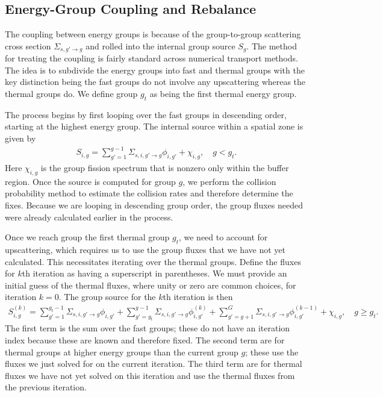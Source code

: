 \subsection{Energy-Group Coupling and Rebalance} \label{Sec:transport_collsionProbability_energyGroupCoupling}

The coupling between energy groups is because of the group-to-group scattering cross section $\Sigma_{s,g' \rightarrow g}$ and rolled into the internal group source $S_g$. The method for treating the coupling is fairly standard across numerical transport methods. The idea is to subdivide the energy groups into fast and thermal groups with the key distinction being the fast groups do not involve any upscattering whereas the thermal groups do. We define group $g_t$ as being the first thermal energy group.

The process begins by first looping over the fast groups in descending order, starting at the highest energy group. The internal source within a spatial zone is given by
\begin{align}
  S_{i,g} = \sum_{g'=1}^{g-1} \Sigma_{s,i,g' \rightarrow g} \phi_{i,g'} + \chi_{i,g} , \quad g < g_t.
\end{align}
Here $\chi_{i,g}$ is the group fission spectrum that is nonzero only within the buffer region. Once the source is computed for group $g$, we perform the collision probability method to estimate the collision rates and therefore determine the fixes. Because we are looping in descending group order, the group fluxes needed were already calculated earlier in the process.

Once we reach group the first thermal group $g_t$, we need to account for upscattering, which requires us to use the group fluxes that we have not yet calculated. This necessitates iterating over the thermal groups. Define the fluxes for $k$th iteration as having a superscript in parentheses. We must provide an initial guess of the thermal fluxes, where unity or zero are common choices, for iteration $k = 0$. The group source for the $k$th iteration is then
\begin{align}
  S_{i,g}^{(k)} = 
  \sum_{g'=1}^{g_t-1} \Sigma_{s,i,g' \rightarrow g} \phi_{i,g'} 
  + \sum_{g'=g_t}^{g-1} \Sigma_{s,i,g' \rightarrow g} \phi_{i,g'}^{(k)} +  \sum_{g'=g+1}^{G} \Sigma_{s,i,g' \rightarrow g} \phi_{i,g'}^{(k-1)} + \chi_{i,g}, \quad g \ge g_t .
\end{align}
The first term is the sum over the fast groups; these do not have an iteration index because these are known and therefore fixed. The second term are for thermal groups at higher energy groups than the current group $g$; these use the fluxes we just solved for on the current iteration. The third term are for thermal fluxes we have not yet solved on this iteration and use the thermal fluxes from the previous iteration.

